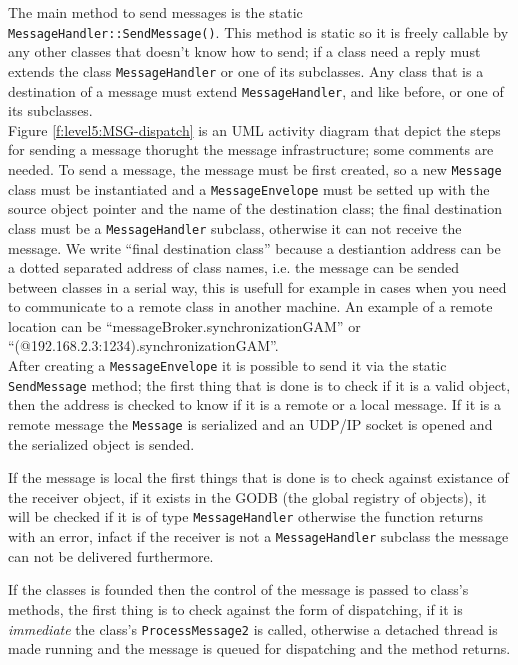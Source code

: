 The main method to send messages is the static \texttt{MessageHandler::SendMessage()}. This method is static so it is freely callable by any other classes that doesn't know how to send; if a class need a reply must extends the class \texttt{MessageHandler} or one of its subclasses. Any class that is a destination of a message must extend \texttt{MessageHandler}, and like before, or one of its subclasses. \\


Figure \ref{f:level5:MSG-dispatch} is an UML activity diagram that depict the steps for sending a message thorught the message infrastructure; some comments are needed. To send a message, the message must be first created, so a new \texttt{Message} class must be instantiated and a \texttt{MessageEnvelope} must be setted up with the source object pointer and the name of the destination class; the final destination class must be a \texttt{MessageHandler} subclass, otherwise it can not receive the message. We write ``final destination class'' because a destiantion address can be a dotted separated address of class names, i.e. the message can be sended between classes in a serial way, this is usefull for example in cases when you need to communicate to a remote class in another machine. An example of a remote location can be ``messageBroker.synchronizationGAM'' or ``(@192.168.2.3:1234).synchronizationGAM''. \\


After creating a \texttt{MessageEnvelope} it is possible to send it via the static \texttt{SendMessage} method; the first thing that is done is to check if it is a valid object, then the address is checked to know if it is a remote or a local message. If it is a remote message the \texttt{Message} is serialized and an UDP/IP socket is opened and the serialized object is sended.

If the message is local the first things that is done is to check against existance of the receiver object, if it exists in the GODB (the global registry of objects), it will be checked if it is of type \texttt{MessageHandler} otherwise the function returns with an error, infact if the receiver is not a \texttt{MessageHandler} subclass the message can not be delivered furthermore.

If the classes is founded then the control of the message is passed to class's methods, the first thing is to check against the form of dispatching, if it is \textit{immediate} the class's \texttt{ProcessMessage2} is called, otherwise a detached thread is made running and the message is queued for dispatching and the method returns.

